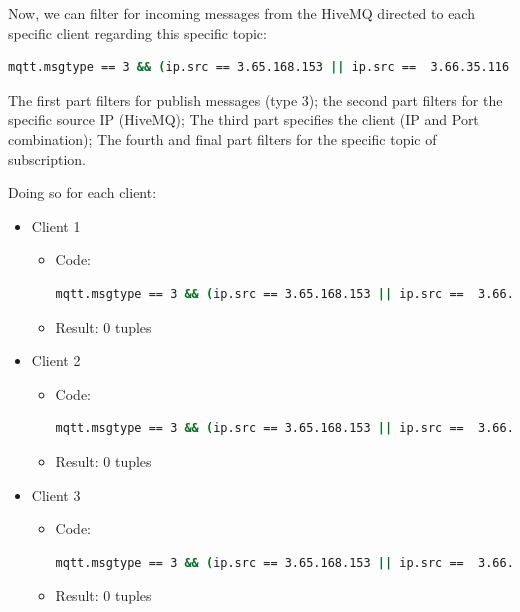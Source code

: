 \documentclass{article}
\begin{document}
\begin{enumerate}
\begin{enumerate}
        Now, we can filter for incoming messages from the HiveMQ directed to each specific client regarding this specific topic:
        
        \begin{lstlisting}[language=bash]
mqtt.msgtype == 3 && (ip.src == 3.65.168.153 || ip.src ==  3.66.35.116 ) && (ip.dst == 10.0.2.15  && tcp.port == CLIENT_PORT) && (mqtt.topic == SUBCRIPTION_TOPIC) \end{lstlisting}

        The first part filters for publish messages (type 3); the second part filters for the specific source IP (HiveMQ); The third part specifies the client (IP and Port combination); The fourth and final part filters for the specific topic of subscription.

        Doing so for each client:
        \begin{itemize}
        
            \item Client 1
            \begin{itemize}
                \item Code:
                \begin{lstlisting}[language=bash]
mqtt.msgtype == 3 && (ip.src == 3.65.168.153 || ip.src ==  3.66.35.116 ) && (ip.dst == 10.0.2.15  && tcp.port == 38887) && (mqtt.topic == "university/department2/floor5")
                \end{lstlisting}
                
                \item Result: 0 tuples
            \end{itemize}
            
            \item Client 2
            \begin{itemize}
                \item Code: \begin{lstlisting}[language=bash]
mqtt.msgtype == 3 && (ip.src == 3.65.168.153 || ip.src ==  3.66.35.116 ) && (ip.dst == 10.0.2.15 && tcp.port == 36707) && (mqtt.topic == " house/kcbplh/section2")
                \end{lstlisting}
                
                \item Result: 0 tuples
            \end{itemize}
            
            \item Client 3
            \begin{itemize}
                \item Code: \begin{lstlisting}[language=bash]
mqtt.msgtype == 3 && (ip.src == 3.65.168.153 || ip.src ==  3.66.35.116 ) && (ip.dst == 10.0.2.15 && tcp.port == 59385) && (mqtt.topic contains "hospital/kcbplh") \end{lstlisting}
                \item Result: 0 tuples
            \end{itemize}
        \end{itemize}


\end{enumerate}
\end{enumerate}
\end{document}
